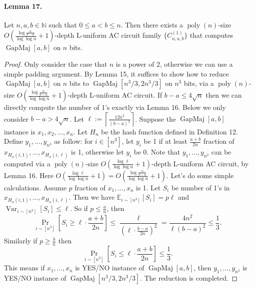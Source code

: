 \paragraph{Lemma 17.} Let $n,a,b\in\mathbb N$ such that $0\le a<b\le n$. Then there exists a $\operatorname{poly}(n)$-size $O\left(\frac{\log\frac n{b-a}}{\log\log n}+1\right)$-depth L-uniform AC circuit family $\{C_{n,a,b}^{(1)}\}$ that computes $\operatorname{GapMaj}[a,b]$ on $n$ bits.
\begin{proof}
Only consider the case that $n$ is a power of 2, otherwise we can use a simple padding argument. By Lemma 15, it suffices to show how to reduce $\operatorname{GapMaj}[a,b]$ on $n$ bits to $\operatorname{GapMaj}[n^3/3,2n^3/3]$ on $n^3$ bits, via a $\operatorname{poly}(n)$-size $O\left(\frac{\log\frac n{b-a}}{\log\log n}+1\right)$-depth L-uniform AC circuit.
If $b-a\le4\sqrt n$ then we can directly compute the number of 1's exactly via Lemma 16. Below we only consider $b-a>4\sqrt n$.
Let $\ell:=\left\lceil\frac{12n^2}{(b-a)^2}\right\rceil$. Suppose the $\operatorname{GapMaj}[a,b]$ instance is $x_1,x_2,\ldots,x_n$. Let $H_n$ be the hash function defined in Definition 12. Define $y_1,\ldots,y_{n^3}$ as follow: for $i\in[n^3]$, let $y_i$ be 1 if at least $\frac{a+b}{2n}$ fraction of $x_{H_n(i,1)},\ldots,x_{H_n(i,\ell)}$ is 1, otherwise let $y_i$ be 0. Note that $y_1,\ldots,y_{n^3}$ can be computed via a $\operatorname{poly}(n)$-size $O\left(\frac{\log\ell}{\log\log n}+1\right)$-depth L-uniform AC circuit, by Lemma 16. Here $O\left(\frac{\log\ell}{\log\log n}+1\right)=O\left(\frac{\log\frac n{b-a}}{\log\log n}+1\right)$.
Let's do some simple calculations. Assume $p$ fraction of $x_1,\ldots,x_n$ is 1. Let $S_i$ be number of 1's in $x_{H_n(i,1)},\ldots,x_{H_n(i,\ell)}$. Then we have $\mathbb E_{i\sim[n^3]}[S_i]=p\ell$ and $\operatorname{Var}_{i\sim[n^3]}[S_i]\le\ell$. So if $p\le\frac an$, then
\[\Pr_{i\sim[n^3]}\left[S_i\ge\ell\cdot\frac{a+b}{2n}\right]\le\frac\ell{(\ell\cdot\frac{b-a}{2n})^2}=\frac{4n^2}{\ell(b-a)^2}\le\frac13.\]
Similarly if $p\ge\frac bn$ then
\[\Pr_{i\sim[n^3]}\left[S_i\le\ell\cdot\frac{a+b}{2n}\right]\le\frac13.\]
This means if $x_1,\ldots,x_n$ is YES/NO instance of $\operatorname{GapMaj}[a,b]$, then $y_1,\ldots,y_{n^3}$ is YES/NO instance of $\operatorname{GapMaj}[n^3/3,2n^3/3]$. The reduction is completed.
\end{proof}
